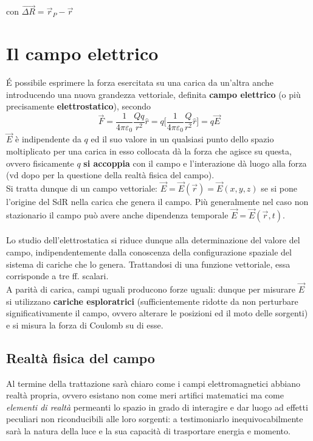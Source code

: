 con $\vec{\Delta R} = \vec{r}_P - \vec{r}$

\section{Il campo elettrico}
\'E possibile esprimere la forza esercitata su una carica da un'altra anche introducendo una nuova grandezza vettoriale, definita \textbf{campo elettrico} (o più precisamente \textbf{elettrostatico}), secondo
\[\vec{F} = \frac{1}{4 \pi \varepsilon_0} \frac{Q q}{r^2} \hat{r} = q \bigg[\frac{1}{4 \pi \varepsilon_0} \frac{Q}{r^2} \hat{r}\bigg] = q \vec{E}\]
$\vec{E}$ è indipendente da $q$ ed il suo valore in un qualsiasi punto dello spazio moltiplicato per una carica in esso collocata dà la forza che agisce su questa, ovvero fisicamente $q$ \textbf{si accoppia} con il campo e l'interazione dà luogo alla forza (vd dopo per la questione della realtà fisica del campo).
\\Si tratta dunque di un campo vettoriale: $\vec{E} = \vec{E}(\vec{r}) = \vec{E}(x,y,z)$ se si pone l'origine del SdR nella carica che genera il campo. Più generalmente nel caso non stazionario il campo può avere anche dipendenza temporale $\vec{E} = \vec{E}(\vec{r}, t)$.
\\~\\Lo studio dell'elettrostatica si riduce dunque alla determinazione del valore del campo, indipendentemente dalla conoscenza della configurazione spaziale del sistema di cariche che lo genera. Trattandosi di una funzione vettoriale, essa corrisponde a tre ff. scalari.
\\A parità di carica, campi uguali producono forze uguali: dunque per misurare $\vec{E}$ si utilizzano \textbf{cariche esploratrici} (sufficientemente ridotte da non perturbare significativamente il campo, ovvero alterare le posizioni ed il moto delle sorgenti) e si misura la forza di Coulomb su di esse.

\subsection{Realtà fisica del campo}
Al termine della trattazione sarà chiaro come i campi elettromagnetici abbiano realtà propria, ovvero esistano non come meri artifici matematici ma come \textit{elementi di realtà} permeanti lo spazio in grado di interagire e dar luogo ad effetti peculiari non riconducibili alle loro sorgenti: a testimoniarlo inequivocabilmente sarà la natura della luce e la sua capacità di trasportare energia e momento.

